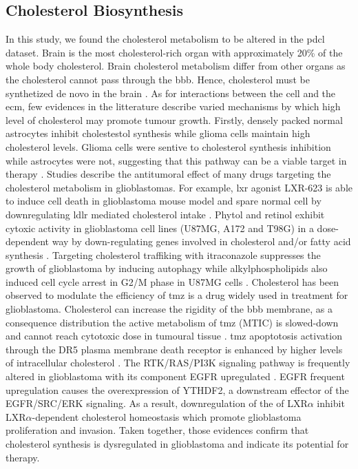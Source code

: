 \subsection{Cholesterol Biosynthesis}

In this study, we found the cholesterol metabolism to be altered in the \acrshort{pdcl} dataset.
Brain is the most cholesterol-rich organ with approximately 20\% of the whole body cholesterol.
Brain cholesterol metabolism differ from other organs as the cholesterol cannot pass through the \acrfull{bbb}.
Hence, cholesterol must be synthetized de novo in the brain \cite*{Villa2016,Yamamoto2018,Pirmoradi2019}.
As for interactions between the cell and the \acrlong{ecm}, few evidences in the litterature describe varied mechanisms by which high level of cholesterol may promote tumour growth.
Firstly, densely packed normal astrocytes inhibit cholestestol synthesis while glioma cells maintain high cholesterol levels.
Glioma cells were sentive to cholesterol synthesis inhibition while astrocytes were not, suggesting that this pathway can be a viable target in therapy \cite*{Kambach2017}.
Studies describe the antitumoral effect of many drugs targeting the cholesterol metabolism in glioblastomas.
For example, \acrfull{lxr} agonist LXR-623 is able to induce cell death in glioblastoma mouse model and spare normal cell by downregulating \acrfull{ldlr} mediated cholesterol intake \cite*{Villa2016, Pirmoradi2019}.
Phytol and retinol exhibit cytoxic activity in glioblastoma cell lines (U87MG, A172 and T98G) in a dose-dependent way by down-regulating genes involved in cholesterol and/or fatty acid synthesis \cite*{Facchini2018}.
Targeting cholesterol traffiking with itraconazole suppresses the growth of glioblastoma by inducing autophagy \cite*{Liu2014} while alkylphospholipids also induced cell cycle arrest in G2/M phase in U87MG cells \cite*{Rios-Marco2013}.
Cholesterol has been observed to modulate the efficiency of \acrfull{tmz} is a drug widely used in treatment for glioblastoma.
Cholesterol can increase the rigidity of the \acrshort{bbb} membrane, as a consequence distribution the active metabolism of \acrshort{tmz} (MTIC) is slowed-down and cannot reach cytotoxic dose in tumoural tissue \cite*{Ramalho2019}.
\acrshort{tmz} apoptotosis activation through the DR5 plasma membrane death receptor is enhanced by higher levels of intracellular cholesterol \cite*{Yamamoto2018}.
The RTK/RAS/PI3K signaling pathway is frequently altered in glioblastoma with its component EGFR upregulated \cite*{McLendon2008}.
EGFR frequent upregulation causes the overexpression of YTHDF2, a downstream effector of the EGFR/SRC/ERK signaling.
As a result, downregulation of the of LXR$\alpha$ inhibit LXR$\alpha$-dependent cholesterol homeostasis which promote glioblastoma proliferation and invasion. 
Taken together, those evidences confirm that cholesterol synthesis is dysregulated in glioblastoma and indicate its potential for therapy.

